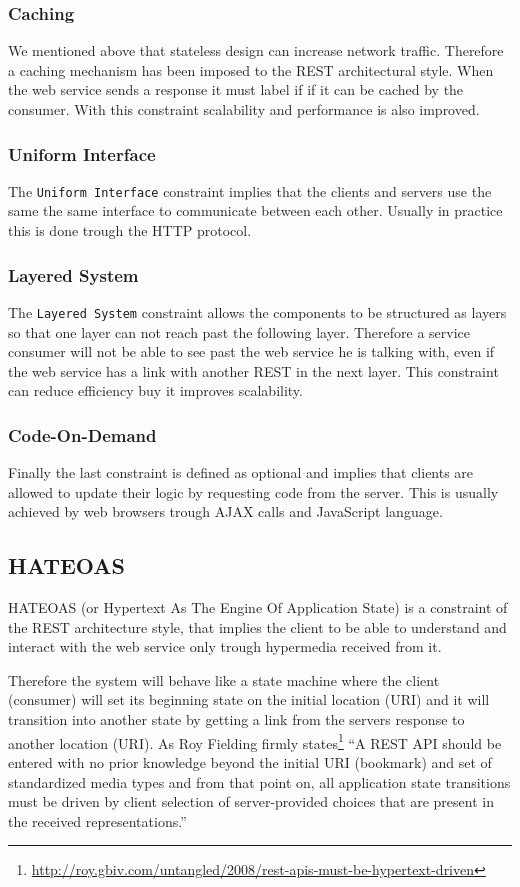 \subsubsection{Caching}
We mentioned above that stateless design can increase network traffic. Therefore a caching mechanism has been imposed to the REST architectural style. When the web service sends a response it must label if if it can be cached by the consumer. With this constraint scalability and performance is also improved.
\subsubsection{Uniform Interface}
The \texttt{Uniform Interface} constraint implies that the clients and servers use the same the same interface to communicate between each other. Usually in practice this is done trough the HTTP protocol.
\subsubsection{Layered System}
The \texttt{Layered System} constraint allows the components to be structured as layers so that one layer can not reach past the following layer. Therefore a service consumer will not be able to see past the web service he is talking with, even if the web service has a link with another REST in the next layer. This constraint can reduce efficiency buy it improves scalability.
\subsubsection{Code-On-Demand}
Finally the last constraint is defined as optional and implies that clients are allowed to update their logic by requesting code from the server. This is usually achieved by web browsers trough AJAX calls and JavaScript language.

\subsection{HATEOAS}
\label{sub-sec:hateoas}

HATEOAS (or Hypertext As The Engine Of Application State) is a constraint of the REST architecture style, that implies the client to be able to understand and interact with the web service only trough hypermedia received from it.

Therefore the system will behave like a state machine where the client (consumer) will set its beginning state on the initial location (URI) and it will transition into another state by getting a link from the servers response to another location (URI). As Roy Fielding firmly states\footnote{\url{http://roy.gbiv.com/untangled/2008/rest-apis-must-be-hypertext-driven}} ``A REST API should be entered with no prior knowledge beyond the initial URI (bookmark) and set of standardized media types and from that point on, all application state transitions must be driven by client selection of server-provided choices that are present in the received representations.''

